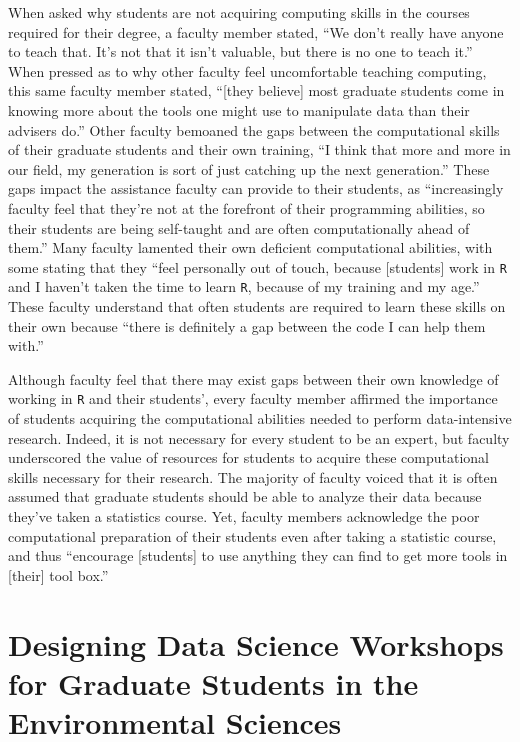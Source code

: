 \documentclass[12pt]{article}
\begin{document}
\quad When asked why students are not acquiring computing skills in the courses
required for their degree, a faculty member stated, ``We don't really have
anyone to teach that. It's not that it isn't valuable, but there is no one to
teach it.'' When pressed as to why other faculty feel uncomfortable teaching
computing, this same faculty member stated, ``[they believe] most graduate
students come in knowing more about the tools one might use to manipulate data
than their advisers do.'' Other faculty bemoaned the gaps between the
computational skills of their graduate students and their own training, 
``I think that more and more in our field, my generation is sort of just 
catching up the next generation.'' These gaps impact the assistance faculty can
provide to their students, as ``increasingly faculty feel that they're not at 
the forefront of their programming abilities, so their students are being 
self-taught and are often computationally ahead of them.'' Many faculty 
lamented their own deficient computational abilities, with some stating that 
they ``feel personally out of touch, because [students] work in \texttt{R} and 
I haven't taken the time to learn \texttt{R}, because of my training and my
age.'' These faculty understand that often students are required to learn these
skills on their own because ``there is definitely a gap between the code I can
help them with.''  

\quad Although faculty feel that there may exist gaps between their own
knowledge of working in \texttt{R} and their students', every faculty member
affirmed the importance of students acquiring the computational abilities needed
to perform data-intensive research. Indeed, it is not necessary for every
student to be an expert, but faculty underscored the value of resources for
students to acquire these computational skills necessary for their research. The
majority of faculty voiced that it is often assumed that graduate students
should be able to analyze their data because they've taken a statistics course.
Yet, faculty members acknowledge the poor computational preparation of their
students even after taking a statistic course, and thus ``encourage [students]
to use anything they can find to get more tools in [their] tool box.'' 

\section{Designing Data Science Workshops for Graduate Students in the 
Environmental Sciences}
\label{sec:workshops}
\end{document}

